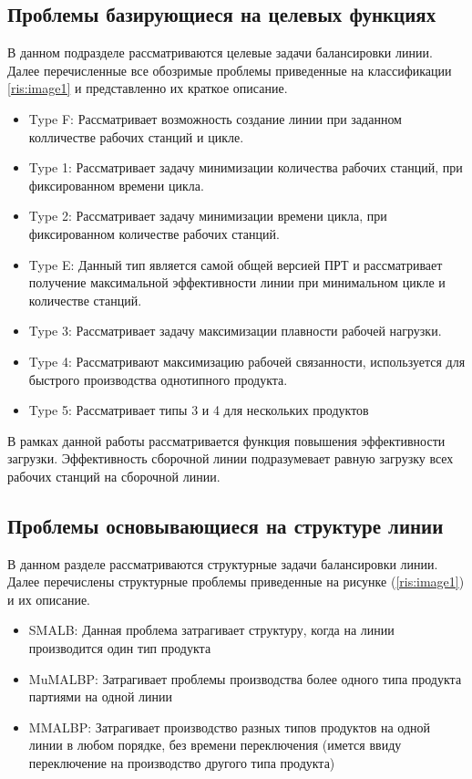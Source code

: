 \subsection{Проблемы базирующиеся на целевых функциях}
В данном подразделе рассматриваются целевые задачи балансировки линии. Далее перечисленные все обозримые проблемы приведенные на классификации \ref{ris:image1} и представленно их краткое описание.
\begin{itemize}
    \item Type F: Рассматривает возможность создание линии при заданном колличестве рабочих станций и цикле.
    \item Type 1: Рассматривает задачу минимизации количества рабочих станций, при фиксированном времени цикла.
    \item Type 2: Рассматривает задачу минимизации времени цикла, при фиксированном количестве рабочих станций.
    \item Type E: Данный тип является самой общей версией ПРТ и рассматривает получение максимальной эффективности линии при минимальном цикле и количестве станций.
    \item Type 3: Рассматривает задачу максимизации плавности рабочей нагрузки.
    \item Type 4: Рассматривают максимизацию рабочей связанности, используется для быстрого производства однотипного продукта.
    \item Type 5: Рассматривает типы 3 и 4 для нескольких продуктов
\end{itemize}

В рамках данной работы рассматривается функция повышения эффективности загрузки. Эффективность сборочной линии подразумевает равную загрузку всех рабочих станций на сборочной линии. 

\subsection{Проблемы основывающиеся на структуре линии}
В данном разделе рассматриваются структурные задачи балансировки линии. Далее перечислены структурные проблемы приведенные на рисунке (\ref{ris:image1}) и их описание.

\begin{itemize}
    \item SMALB: Данная проблема затрагивает структуру, когда на линии производится один тип продукта
    \item MuMALBP: Затрагивает проблемы производства более одного типа продукта партиями на одной линии
    \item MMALBP: Затрагивает производство разных типов продуктов на одной линии в любом порядке, без времени переключения (имется ввиду переключение на производство другого типа продукта)
\end{itemize}

